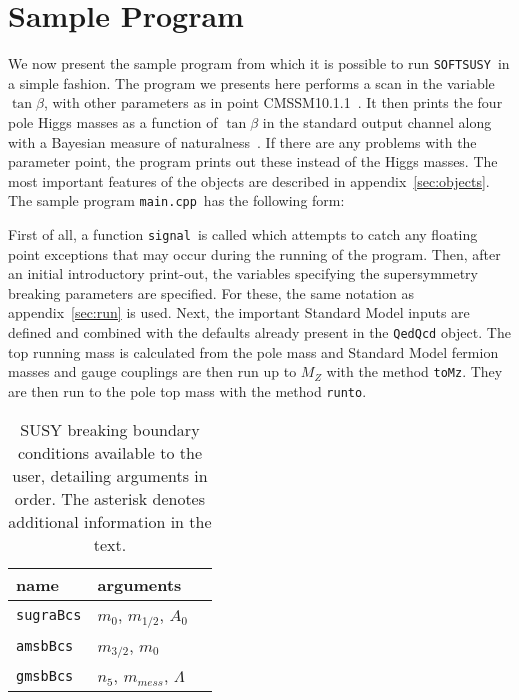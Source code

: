 \documentclass{article}
\def\SOFTSUSY{{\tt SOFTSUSY}}
\def\code#1{\small{\tt #1}\normalsize}
\begin{document}
\section{Sample Program \label{sec:prog}}
We now present the sample program from which it is possible to run
\SOFTSUSY~in a simple fashion. The program we presents here performs a scan in
the variable $\tan \beta$, with other parameters as in point
CMSSM10.1.1~\cite{bench}. 
It then prints the four pole Higgs masses as a function of $\tan \beta$ in the
standard output channel along with a Bayesian measure of naturalness~\cite{1709.07895}. If there are any problems with the parameter point,
the program prints out these instead of the Higgs masses.
The most important features of the objects are 
described in appendix~\ref{sec:objects}.
The sample program \code{main.cpp}~has the following form: 
\small

\normalsize
First of all, a function \code{signal}~is called which attempts to catch any
floating point 
exceptions that may occur during the running of the program. 
Then, after an initial introductory print-out, the variables specifying the
supersymmetry breaking parameters are specified. For these, the same notation
as appendix~\ref{sec:run} is used. Next, the important Standard Model inputs
are defined and combined with the defaults already present in the
\code{QedQcd} object. The top running mass is calculated from the pole mass
and 
Standard Model fermion masses and gauge couplings are
then run up to $M_Z$ with the method \code{toMz}.
They are then run to the pole top mass with the method 
\code{runto}. 

\begin{table}\begin{center}
\begin{tabular}[l]{lll} name & arguments \\ 
\hline
\code{sugraBcs} & $m_0$, $m_{1/2}$, $A_0$ \\
\code{amsbBcs} & $m_{3/2}$, $m_0$ \\
\code{gmsbBcs} & $n_5$, $m_{mess}$, $\Lambda$ \\
\end{tabular}\caption{\label{bcs} SUSY breaking boundary conditions available to the user, detailing arguments
in order. The asterisk denotes additional information in the text.}\end{center}\end{table}
\end{document}

